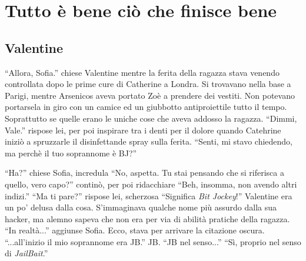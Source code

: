 \chapter{Tutto è bene ciò che finisce bene}
  
  \section*{Valentine}

    ``Allora, Sofia.'' chiese Valentine mentre la ferita della ragazza stava venendo controllata dopo le prime cure di
    Catherine a Londra. Si trovavano nella base a Parigi, mentre Arsenicos aveva portato Zoè a prendere dei vestiti. Non
    potevano portarsela in giro con un camice ed un giubbotto antiproiettile tutto il tempo. Soprattutto se quelle erano
    le uniche cose che aveva addosso la ragazza. ``Dimmi, Vale.'' rispose lei, per poi inspirare tra i denti per il
    dolore quando Catehrine iniziò a spruzzarle il disinfettande spray sulla ferita. ``Senti, mi stavo chiedendo, ma
    perchè il tuo soprannome è BJ?''

    ``Ha?'' chiese Sofia, incredula ``No, aspetta. Tu stai pensando che si riferisca a quello, vero capo?'' continò, per
    poi ridacchiare ``Beh, insomma, non avendo altri indizi.'' ``Ma ti pare?'' rispose lei, scherzosa ``Significa \emph{Bit
    Jockey}!'' Valentine era un po' delusa dalla cosa. S'immaginava qualche nome più assurdo dalla sua hacker, ma alemno
    sapeva che non era per via di abilità pratiche della ragazza. ``In realtà...'' aggiunse Sofia. Ecco, stava per
    arrivare la citazione oscura. ``...all'inizio il mio soprannome era JB.'' JB. ``JB nel senso...'' ``Sì, proprio nel
    senso di \emph{JailBait}.''

